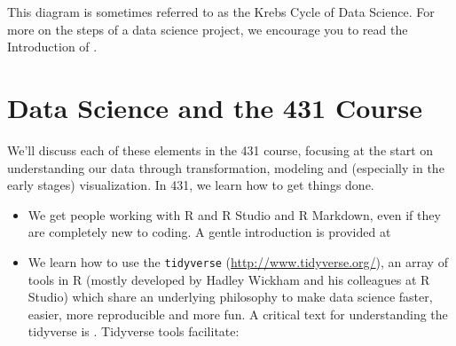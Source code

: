 \documentclass[
]{book}
\providecommand{\tightlist}{%
  \setlength{\itemsep}{0pt}\setlength{\parskip}{0pt}}
\begin{document}
This diagram is sometimes referred to as the Krebs Cycle of Data Science. For more on the steps of a data science project, we encourage you to read the Introduction of \citet{R4DS}.

\hypertarget{data-science-and-the-431-course}{%
\section{Data Science and the 431 Course}\label{data-science-and-the-431-course}}

We'll discuss each of these elements in the 431 course, focusing at the start on understanding our data through transformation, modeling and (especially in the early stages) visualization. In 431, we learn how to get things done.

\begin{itemize}
\tightlist
\item
  We get people working with R and R Studio and R Markdown, even if they are completely new to coding. A gentle introduction is provided at \citet{ModernDive}
\item
  We learn how to use the \texttt{tidyverse} (\url{http://www.tidyverse.org/}), an array of tools in R (mostly developed by Hadley Wickham and his colleagues at R Studio) which share an underlying philosophy to make data science faster, easier, more reproducible and more fun. A critical text for understanding the tidyverse is \citet{R4DS}. Tidyverse tools facilitate:


\end{itemize}
\end{document}
